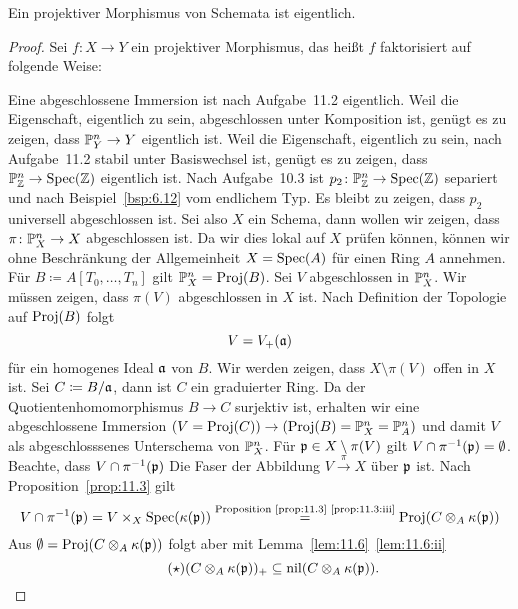 \begin{thm}
\label{thm:11.7}
	Ein projektiver Morphismus von Schemata ist eigentlich.
	\begin{proof}
		Sei $f\colon X \to Y$ ein projektiver Morphismus, das heißt $f$ faktorisiert auf folgende Weise:
		\begin{center}
		\end{center}
		Eine abgeschlossene Immersion ist nach Aufgabe~11.2 eigentlich. Weil die Eigenschaft, eigentlich zu sein, abgeschlossen unter Komposition ist, genügt es zu zeigen, dass $\P_Y^n\to Y$ eigentlich ist. Weil die Eigenschaft, eigentlich zu sein, nach Aufgabe~11.2 stabil unter Basiswechsel ist, genügt es zu zeigen, dass $\P^n_\Z\to \Spec(\Z)$ eigentlich ist. Nach Aufgabe~10.3 ist $p_2\colon \P^n_\Z \to \Spec(\Z)$ separiert und nach Beispiel~\ref{bsp:6.12} vom endlichem Typ. Es bleibt zu zeigen, dass $p_2$ universell abgeschlossen ist. Sei also $X$ ein Schema, dann wollen wir zeigen, dass $\pi\colon \P^n_X\to X$ abgeschlossen ist. Da wir dies lokal auf $X$ prüfen können, können wir ohne Beschränkung der Allgemeinheit $X = \Spec(A)$ für einen Ring $A$ annehmen. Für $B\coloneqq A[T_0,\ldots,T_n]$ gilt $\P^n_X=\Proj(B)$. Sei $V$ abgeschlossen in $\P^n_X$. Wir müssen zeigen, dass $\pi(V)$ abgeschlossen in $X$ ist. Nach Definition der Topologie auf $\Proj(B)$ folgt
		\[
			V = V_+(\mfa)
		\]
		für ein homogenes Ideal $\mfa$ von $B$. Wir werden zeigen, dass $X \setminus\pi(V)$ offen in $X$ ist. Sei $C\coloneqq B/\mfa$, dann ist $C$ ein graduierter Ring. Da der Quotientenhomomorphismus $B\to C$ surjektiv ist, erhalten wir eine abgeschlossene Immersion $(V=\Proj(C))\to (\Proj(B) =\P^n_X = \P^n_A)$ und damit $V$ als abgeschlosssenes Unterschema von $\P^n_X$. Für $\mfp \in X \setminus \pi(V)$ gilt $V \cap \pi^{-1}(\mfp) = \emptyset$. Beachte, dass $V\cap \pi^{-1}(\mfp)$ Die Faser der Abbildung $V\overset{\pi}{\longrightarrow} X$ über $\mfp$ ist. Nach Proposition~\ref{prop:11.3} gilt
		\[
			V \cap \pi^{-1}(\mfp) = V \times_X\Spec(\kappa(\mfp)) \overset{\text{Proposition~\ref{prop:11.3}~\ref{prop:11.3:iii}}}{=} \Proj(C\otimes_A\kappa(\mfp))
		\]
		Aus $\emptyset = \Proj(C\otimes_A\kappa(\mfp))$ folgt aber mit Lemma~\ref{lem:11.6}~\ref{lem:11.6:ii}
		\[\label{eq:11.7.1}\tag{$\star$}
			(C\otimes_A\kappa(\mfp))_+ \subseteq \nil(C\otimes_A\kappa(\mfp)).
		\]

\end{proof}
\end{thm}
